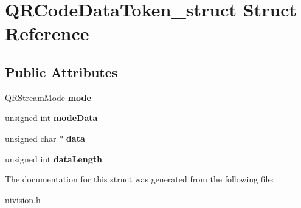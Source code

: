 \hypertarget{structQRCodeDataToken__struct}{
\section{QRCodeDataToken\_\-struct Struct Reference}
\label{structQRCodeDataToken__struct}
}
\subsection*{Public Attributes}
\begin{DoxyCompactItemize}
\item 
\hypertarget{structQRCodeDataToken__struct_a0f9585b7dce912efb4c4e45bc1450d49}{
QRStreamMode {\bfseries mode}}
\label{structQRCodeDataToken__struct_a0f9585b7dce912efb4c4e45bc1450d49}

\item 
\hypertarget{structQRCodeDataToken__struct_a60be3d2613a906d29f1970a61315ada2}{
unsigned int {\bfseries modeData}}
\label{structQRCodeDataToken__struct_a60be3d2613a906d29f1970a61315ada2}

\item 
\hypertarget{structQRCodeDataToken__struct_a492586d7e37d569d48c1bafa12409ac0}{
unsigned char $\ast$ {\bfseries data}}
\label{structQRCodeDataToken__struct_a492586d7e37d569d48c1bafa12409ac0}

\item 
\hypertarget{structQRCodeDataToken__struct_a3caa07d690d0be3be196a028d93f0b03}{
unsigned int {\bfseries dataLength}}
\label{structQRCodeDataToken__struct_a3caa07d690d0be3be196a028d93f0b03}

\end{DoxyCompactItemize}


The documentation for this struct was generated from the following file:\begin{DoxyCompactItemize}
\item 
nivision.h\end{DoxyCompactItemize}
